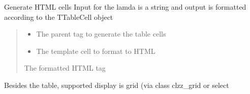 \documentclass[letterpaper,10pt,english]{sphinxmanual}
\begin{document}
\begin{savenotes}
\begin{fulllineitems}
\begin{savenotes}\begin{fulllineitems}
\label{\detokenize{eezz:eezz.http_agent.THttpAgent.generate_html_cells}}
\pysigstartsignatures
{}
\pysigstopsignatures
\sphinxAtStartPar
Generate HTML cells
Input for the lamda is a string and output is formatted according to the TTableCell object
\begin{quote}\begin{description}
\begin{itemize}
\item {} 
\sphinxAtStartPar
{} \textendash{} The parent tag to generate the table cells

\item {} 
\sphinxAtStartPar
{} \textendash{} The template cell to format to HTML

\end{itemize}

\sphinxAtStartPar
The formatted HTML tag

\end{description}\end{quote}

\end{fulllineitems}\end{savenotes}


\begin{savenotes}\begin{fulllineitems}
\label{\detokenize{eezz:eezz.http_agent.THttpAgent.generate_html_grid}}
\pysigstartsignatures
{}
\pysigstopsignatures
\sphinxAtStartPar
Besides the table, supported display is grid (via class clzz\_grid or select

\end{fulllineitems}\end{savenotes}


\end{fulllineitems}
\end{savenotes}
\end{document}
